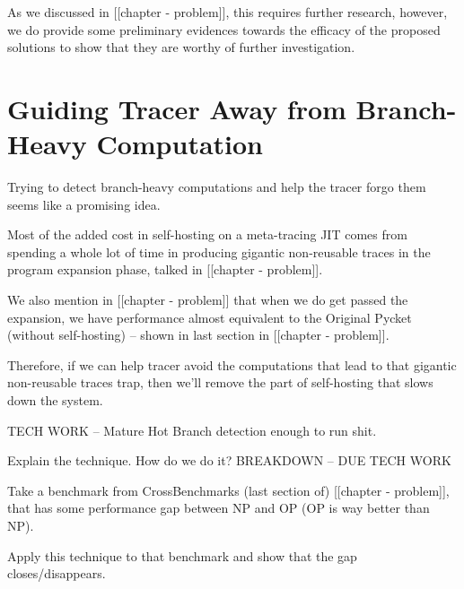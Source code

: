     \begin{paragraph-here}
      As we discussed in [[chapter - problem]], this requires further research, however, we do provide some preliminary evidences towards the efficacy of the proposed solutions to show that they are worthy of further investigation.
    \end{paragraph-here}


	\section{Guiding Tracer Away from Branch-Heavy Computation}
		\begin{mainpoint}
			Trying to detect branch-heavy computations and help the tracer forgo them seems like a promising idea.
		\end{mainpoint}


    \begin{paragraph-here}
      Most of the added cost in self-hosting on a meta-tracing JIT comes from spending a whole lot of time in producing gigantic non-reusable traces in the program expansion phase, talked in [[chapter - problem]].
    \end{paragraph-here}

    \begin{paragraph-here}
      We also mention in [[chapter - problem]] that when we do get passed the expansion, we have performance almost equivalent to the Original Pycket (without self-hosting) -- shown in last section in [[chapter - problem]].
    \end{paragraph-here}

    \begin{paragraph-here}
      Therefore, if we can help tracer avoid the computations that lead to that gigantic non-reusable traces trap, then we'll remove the part of self-hosting that slows down the system.
    \end{paragraph-here}

    \begin{todo}
      TECH WORK -- Mature Hot Branch detection enough to run shit.
    \end{todo}

    \begin{paragraph-here}
      Explain the technique.
      How do we do it? BREAKDOWN -- DUE TECH WORK
    \end{paragraph-here}

    \begin{show-experiment}
      Take a benchmark from CrossBenchmarks (last section of) [[chapter - problem]], that has some performance gap between NP and OP (OP is way better than NP).

      Apply this technique to that benchmark and show that the gap closes/disappears.
    \end{show-experiment}

